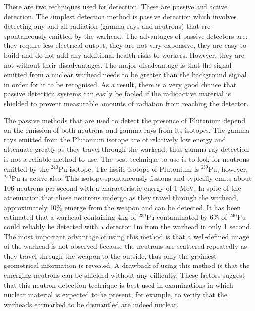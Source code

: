 \documentclass[twoside,titlepage,11pt,twocolumn,a4paper]{article}
\begin{document}
There are two techniques used for detection. These are passive and
active detection. The simplest detection method is passive detection
which involves detecting any and all radiation (gamma rays and
neutrons) that are spontaneously emitted by the
warhead. \citep{hippel1990} The advantages of passive detectors are:
they require less electrical output, they are not very expensive, they
are easy to build and do not add any additional health risks to
workers. However, they are not without their disadvantages. The major
disadvantage is that the signal emitted from a nuclear warhead needs
to be greater than the background signal in order for it to be
recognised. As a result, there is a very good chance that passive
detection systems can easily be fooled if the radioactive material is
shielded to prevent measurable amounts of radiation from reaching the
detector. \citep{nuclearDetArch2009}

The passive methods that are used to detect the presence of Plutonium
depend on the emission of both neutrons and gamma rays from its
isotopes. The gamma rays emitted from the Plutonium isotope are of
relatively low energy and attenuate greatly as they travel through the
warhead, thus gamma ray detection is not a reliable method to use. The
best technique to use is to look for neutrons emitted by the \(
\mathrm{^{240}Pu} \) isotope. The fissile isotope of Plutonium is \(
\mathrm{^{239}Pu} \); however, \( \mathrm{^{240}Pu} \) is active also.
\citep{drell1993} This isotope spontaneously fissions and typically
emits about 106 neutrons per second with a characteristic energy of 1
MeV. \citep{drell1993} In spite of the attenuation that these neutrons
undergo as they travel through the warhead, approximately 10\% emerge
from the weapon and can be detected. It has been estimated that a
warhead containing 4kg of \( \mathrm{^{239}Pu} \) contaminated by 6\%
of \( \mathrm{^{240}Pu} \) could reliably be detected with a detector
1m from the warhead in only 1 second. \citep{drell1993} The most
important advantage of using this method is that a well-defined image
of the warhead is not observed because the neutrons are scattered
repeatedly as they travel through the weapon to the outside, thus only
the grainiest geometrical information is
revealed. \citep{drell1993,drell1990} A drawback of using this method
is that the emerging neutrons can be shielded without any
difficulty. These factors suggest that this neutron detection
technique is best used in examinations in which nuclear material is
expected to be present, for example, to verify that the warheads
earmarked to be dismantled are indeed nuclear.
\end{document}
